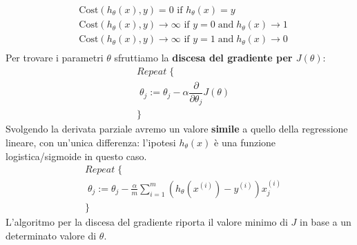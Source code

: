 \begin{align*}& \mathrm{Cost}(h_\theta(x),y) = 0 \text{ if } h_\theta(x) = y \\ & \mathrm{Cost}(h_\theta(x),y) \rightarrow \infty \text{ if } y = 0 \; \mathrm{and} \; h_\theta(x) \rightarrow 1 \\ & \mathrm{Cost}(h_\theta(x),y) \rightarrow \infty \text{ if } y = 1 \; \mathrm{and} \; h_\theta(x) \rightarrow 0 \\ \end{align*}
Per trovare i parametri $\theta$ sfruttiamo la \textbf{discesa del gradiente per $J(\theta)$}:
\begin{align*}& Repeat \; \lbrace \\ & \; \theta_j := \theta_j - \alpha \dfrac{\partial}{\partial \theta_j}J(\theta) \\ & \rbrace\end{align*}
Svolgendo la derivata parziale avremo un valore \textbf{simile} a quello della regressione lineare, con un'unica differenza: l'ipotesi $h_\theta(x)$ è una funzione logistica/sigmoide in questo caso.
\begin{align*} & Repeat \; \lbrace \\ & \; \theta_j := \theta_j - \frac{\alpha}{m} \sum_{i=1}^m (h_\theta(x^{(i)}) - y^{(i)}) x_j^{(i)} \\ & \rbrace \end{align*}
L'algoritmo per la discesa del gradiente riporta il valore minimo di $J$ in base a un determinato valore di $\theta$.
